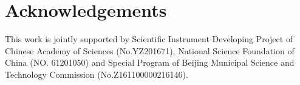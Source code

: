 \documentclass{article}
\begin{document}
\section{Acknowledgements}
This work is jointly supported by Scientific Instrument Developing Project of Chinese Academy of Sciences (No.YZ201671), National Science Foundation of China (NO. 61201050) and Special Program of Beijing Municipal Science and Technology Commission (No.Z161100000216146).

\newpage


\end{document}

